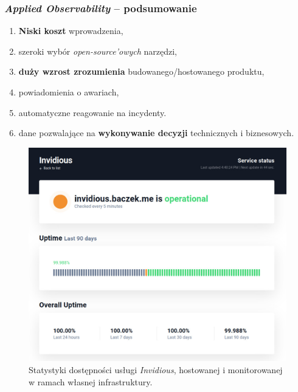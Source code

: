 \documentclass[]{beamer}
\begin{document}
\begin{frame}
  \frametitle{\textit{Applied Observability} -- podsumowanie}

\begin{multicols}{2}

  \begin{enumerate}
    \item \textbf{Niski koszt} wprowadzenia,
    \item szeroki wybór \textit{open-source'owych} narzędzi,
    \item \textbf{duży wzrost zrozumienia} budowanego/hostowanego produktu,
    \item powiadomienia o awariach,
    \item automatyczne reagowanie na incydenty.
    \item dane pozwalające na \textbf{wykonywanie decyzji} technicznych i biznesowych.
  \end{enumerate}

  \begin{figure}
    \centering
    \includegraphics[width=1.0\linewidth]{invidious_uptime.jpg}
    \caption{Statystyki dostępności usługi \textit{Invidious}, hostowanej i monitorowanej w ramach własnej infrastruktury.}
  \end{figure}
\end{multicols}

\end{frame}
\end{document}
